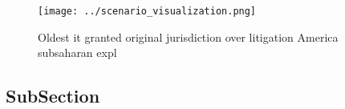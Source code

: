 \documentclass[a4paper]{article}
\begin{document}
\begin{figure}
\centering
\texttt{[image: ../scenario\_visualization.png]}
\caption{Oldest it granted original jurisdiction over litigation America subsaharan expl
}
\end{figure}
 
\subsection{SubSection}
\end{document}
